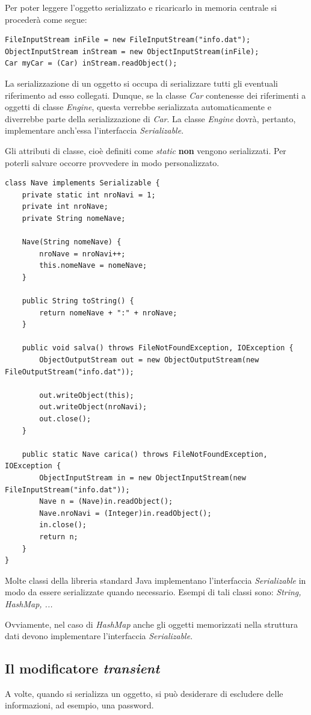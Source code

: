 \documentclass[12pt]{report}
\begin{document}
Per poter leggere l'oggetto serializzato e ricaricarlo in memoria centrale si procederà come segue:
\begin{lstlisting}[style=javastyle]
FileInputStream inFile = new FileInputStream("info.dat");
ObjectInputStream inStream = new ObjectInputStream(inFile);
Car myCar = (Car) inStream.readObject();
\end{lstlisting}
La serializzazione di un oggetto si occupa di serializzare tutti gli eventuali riferimento ad esso collegati. Dunque, se la classe \textit{Car} contenesse dei riferimenti a oggetti di classe \textit{Engine}, questa verrebbe serializzata automaticamente e diverrebbe parte della serializzazione di \textit{Car}. La classe \textit{Engine} dovrà, pertanto, implementare anch'essa l'interfaccia \textit{Serializable}.

\begin{note}{}{}
Gli attributi di classe, cioè definiti come \textit{static} \textbf{non} vengono serializzati. Per poterli salvare occorre provvedere in modo personalizzato.
\end{note}
\begin{lstlisting}[style=javastyle]
class Nave implements Serializable {
	private static int nroNavi = 1;
	private int nroNave;
	private String nomeNave;

	Nave(String nomeNave) {
		nroNave = nroNavi++;
		this.nomeNave = nomeNave;
	}

	public String toString() {
		return nomeNave + ":" + nroNave;
	}

	public void salva() throws FileNotFoundException, IOException {
		ObjectOutputStream out = new ObjectOutputStream(new FileOutputStream("info.dat"));

		out.writeObject(this);
		out.writeObject(nroNavi);
		out.close();
	}

	public static Nave carica() throws FileNotFoundException, IOException {
		ObjectInputStream in = new ObjectInputStream(new FileInputStream("info.dat"));
		Nave n = (Nave)in.readObject();
		Nave.nroNavi = (Integer)in.readObject();
		in.close();
		return n;
	}
}
\end{lstlisting}
Molte classi della libreria standard Java implementano l'interfaccia \textit{Serializable} in modo da essere serializzate quando necessario. Esempi di tali classi sono: \textit{String, HashMap, ...}

Ovviamente, nel caso di \textit{HashMap} anche gli oggetti memorizzati nella struttura dati devono implementare l'interfaccia \textit{Serializable}.
\subsection{Il modificatore \textit{transient}}
A volte, quando si serializza un oggetto, si può desiderare di escludere delle informazioni, ad esempio, una password.
\end{document}
